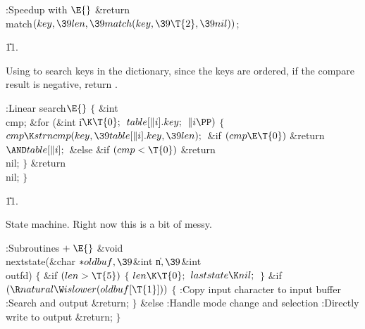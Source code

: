 \B{}:Speedup with \X${}\E{}$\6
\&{return} \\{match}${}(\\{key},\39\\{len},\39\\{match}(\\{key},\39\T{2},\39%
\\{nil})){}$;\par
\U11.\fi

Using  to search keys in the dictionary, since the keys
are ordered, if the compare result is negative, return .

\Y\B\4:Linear search\X${}\E{}$\6
${}\{{}$\1\6
\&{int} \\{cmp};\7
\&{for} (\&{int} \|i${}\K\T{0};{}$ ${}\\{table}[\|i].\\{key};{}$ ${}\|i\PP){}$\5
${}\{{}$\1\6
${}\\{cmp}\K\\{strncmp}(\\{key},\39\\{table}[\|i].\\{key},\39\\{len});{}$\6
\&{if} ${}(\\{cmp}\E\T{0}){}$\1\5
\&{return} ${}{\AND}\\{table}[\|i];{}$\2\6
\&{else} \&{if} ${}(\\{cmp}<\T{0}){}$\1\5
\&{return} \\{nil};\2\6
\4${}\}{}$\2\6
\&{return} \\{nil};\6
\4${}\}{}$\2\par
\U11.\fi

State machine. Right now this is a bit of messy.

\Y\B\4:Subroutines\X${}\mathrel+\E{}$\6
\1\1\&{void} \\{nextstate}(\&{char} ${}{*}\\{oldbuf},\39{}$\&{int} \|n${},%
\39{}$\&{int} \\{outfd})\2\2\6
${}\{{}$\1\6
\&{if} ${}(\\{len}>\T{5}){}$\5
${}\{{}$\1\6
${}\\{len}\K\T{0};{}$\6
${}\\{laststate}\K\\{nil};{}$\6
\4${}\}{}$\2\6
\&{if} ${}(\R\\{natural}\W\\{islower}(\\{oldbuf}[\T{1}])){}$\5
${}\{{}$\1\6
:Copy input character to input buffer\X\6
:Search and output\X\6
\&{return};\6
\4${}\}{}$\2\6
\&{else}\1\5
:Handle mode change and selection\X\2\6
:Directly write to output\X\6
\&{return};\6
\4${}\}{}$\2\par
\fi

